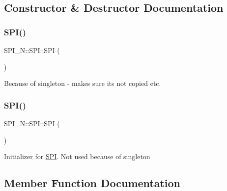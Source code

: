 \subsection{Constructor \& Destructor Documentation}
\hypertarget{class_s_p_i___n_1_1_s_p_i_ab486ba0f0d9ec880520e568762cc6c7d}{}\label{class_s_p_i___n_1_1_s_p_i_ab486ba0f0d9ec880520e568762cc6c7d} 
\subsubsection{\texorpdfstring{S\+P\+I()}{SPI()}\hspace{0.1cm}{\footnotesize\ttfamily [1/2]}}
{\footnotesize\ttfamily S\+P\+I\+\_\+\+N\+::\+S\+P\+I\+::\+S\+PI (\begin{DoxyParamCaption}\item[{const \hyperlink{class_s_p_i___n_1_1_s_p_i}{S\+PI} \&}]{ }\end{DoxyParamCaption})\hspace{0.3cm}{\ttfamily [delete]}}

Because of singleton -\/ makes sure its not copied etc. \hypertarget{class_s_p_i___n_1_1_s_p_i_a8fec1a6e642a5758acf974b92e28a9e6}{}\label{class_s_p_i___n_1_1_s_p_i_a8fec1a6e642a5758acf974b92e28a9e6} 
\subsubsection{\texorpdfstring{S\+P\+I()}{SPI()}\hspace{0.1cm}{\footnotesize\ttfamily [2/2]}}
{\footnotesize\ttfamily S\+P\+I\+\_\+\+N\+::\+S\+P\+I\+::\+S\+PI (\begin{DoxyParamCaption}{ }\end{DoxyParamCaption})\hspace{0.3cm}{\ttfamily [private]}}

Initializer for \hyperlink{class_s_p_i___n_1_1_s_p_i}{S\+PI}. Not used because of singleton 

\subsection{Member Function Documentation}
\hypertarget{class_s_p_i___n_1_1_s_p_i_abc266ff9d817b8d4437d1da47fe8e7ae}{}\label{class_s_p_i___n_1_1_s_p_i_abc266ff9d817b8d4437d1da47fe8e7ae} 
